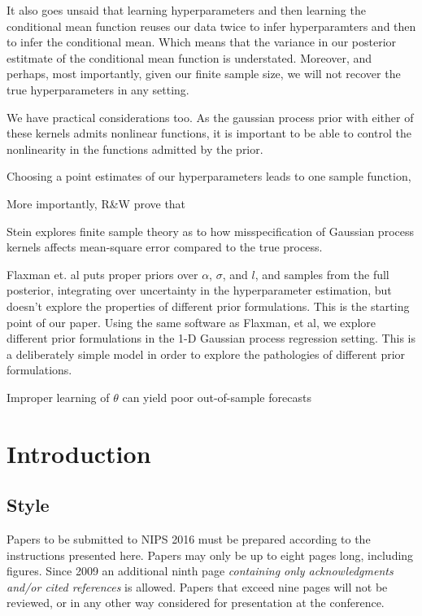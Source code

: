 \documentclass{article}
\begin{document}
It also goes unsaid that learning hyperparameters and then learning the
conditional mean function reuses our data twice to infer hyperparamters and
then to infer the conditional mean. Which means that the variance in our
posterior estitmate of the conditional mean function is understated.  Moreover,
and perhaps, most importantly, given our finite sample size, we will not
recover the true hyperparameters in any setting. 

We have practical considerations too. As the gaussian process prior with either
of these kernels admits nonlinear functions, it is important to be able to
control the nonlinearity in the functions admitted by the prior. 

Choosing a point estimates of our hyperparameters leads to one sample function, 

More importantly, R\&W prove that 

Stein explores finite sample theory as to how misspecification of Gaussian
process kernels affects mean-square error compared to the true process.

Flaxman et. al puts proper priors over $\alpha$, $\sigma$, and $l$, and samples
from the full posterior, integrating over uncertainty in the hyperparameter
estimation, but doesn't explore the properties of different prior formulations.
This is the starting point of our paper. Using the same software as Flaxman, et
al, we explore different prior formulations in the 1-D Gaussian process
regression setting.  This is a deliberately simple model in order to explore
the pathologies of different prior formulations.


Improper learning of $\theta$ can yield poor out-of-sample forecasts 
\section{Introduction}








\subsection{Style}

Papers to be submitted to NIPS 2016 must be prepared according to the
instructions presented here. Papers may only be up to eight pages
long, including figures. Since 2009 an additional ninth page
\emph{containing only acknowledgments and/or cited references} is
allowed. Papers that exceed nine pages will not be reviewed, or in any
other way considered for presentation at the conference.
\end{document}
